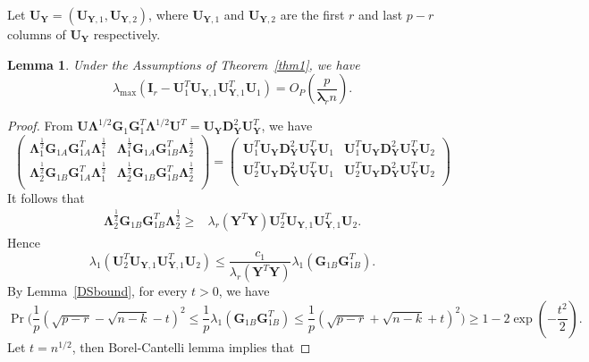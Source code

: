 \documentclass[12pt]{article} %
\newcommand{\bY}{\mathbf{Y}}
\newcommand{\bG}{\mathbf{G}}
\newcommand{\bI}{\mathbf{I}}
\newcommand{\bU}{\mathbf{U}}
\newcommand{\bD}{\mathbf{D}}
\newcommand{\bfsym}[1]{\ensuremath{\boldsymbol{#1}}}
\def\blambda {\bfsym {\lambda}}
\def\bLambda {\bfsym {\Lambda}}
\newtheorem{lemma}{Lemma}
\theoremstyle{definition}
\begin{document}
Let $\bU_\bY=(\bU_{\bY,1},\bU_{\bY,2})$, where $\bU_{\bY,1}$ and $\bU_{\bY,2}$ are the first $r$ and last $p-r$ columns of $\bU_\bY$ respectively.
\begin{lemma}\label{PCAlemma2}
    Under the Assumptions of Theorem~\ref{thm1}, we have
$$
\lambda_{\max}(\bI_r-\bU_1^T \bU_{\bY,1}\bU_{\bY,1}^T \bU_1)
=O_P(\frac{ p}{\blambda_r n}).
$$
\end{lemma}
\begin{proof}
    From
$
\bU\bLambda^{1/2} \bG_1 \bG_1^T \bLambda^{1/2} \bU^T 
=\bU_{\bY}\bD_{\bY}^2 \bU_{\bY}^T
$,
we have
$$
    \begin{pmatrix}        
        \bLambda_{1}^{\frac{1}{2}}\bG_{1A} \bG_{1A}^T \bLambda_1^{\frac{1}{2}}&
        \bLambda_{1}^{\frac{1}{2}} \bG_{1A}\bG_{1B}^T\bLambda_2^{\frac{1}{2}}\\
        \bLambda_{2}^{\frac{1}{2}} \bG_{1B} \bG_{1A}^T\bLambda_1^{\frac{1}{2}} &
        \bLambda_{2}^{\frac{1}{2}}\bG_{1B}\bG_{1B}^T\bLambda_2^{\frac{1}{2}}\\
    \end{pmatrix}
    =
    \begin{pmatrix}        
         \bU_1^T \bU_{\bY}\bD_{\bY}^2 \bU_{\bY}^T \bU_1&
         \bU_1^T \bU_{\bY}\bD_{\bY}^2 \bU_{\bY}^T \bU_2\\
        \bU_2^T \bU_{\bY}\bD_{\bY}^2 \bU_{\bY}^T \bU_1&
         \bU_2^T \bU_{\bY}\bD_{\bY}^2 \bU_{\bY}^T \bU_2\\
    \end{pmatrix}
$$
It follows that
$$
\begin{aligned}
 \bLambda_{2}^{\frac{1}{2}}\bG_{1B} \bG_{1B}^T  \bLambda_{2}^{\frac{1}{2}}
\geq&
    \lambda_r(\bY^T \bY) \bU_{2}^T \bU_{\bY,1}\bU_{\bY,1}^T \bU_{2}.
\end{aligned}
$$
Hence
    \begin{equation}\label{ineq:eigenvector}
\lambda_{1}(\bU_{2}^T \bU_{\bY,1} \bU_{\bY,1}^T \bU_{2})\leq
\frac{c_1}{\lambda_r(\bY^T \bY)} \lambda_{1}
(\bG_{1B} \bG_{1B}^T).
    \end{equation}
    By Lemma~\ref{DSbound}, for every $t>0$, we have
    $$
    \Pr\Big(\frac{1}{p}(\sqrt{p-r}-\sqrt{n-k}-t)^2 \leq \frac{1}{p}{\lambda_1(\bG_{1B}\bG_{1B}^T)}\leq \frac{1}{p}(\sqrt{p-r}+\sqrt{n-k}+t)^2 \Big) 
   \geq 1-2\exp(-\frac{t^2}{2}).
    $$
    Let $t=n^{1/2}$, then Borel-Cantelli lemma implies that 

\end{proof}
\end{document}

